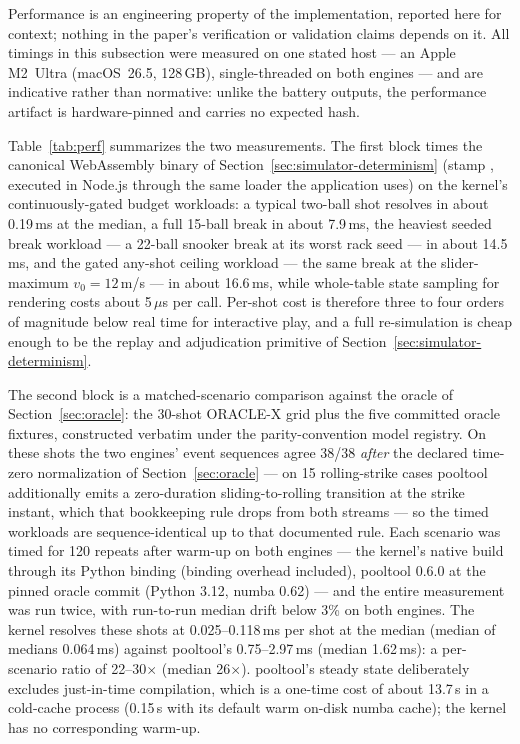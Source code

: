 Performance is an engineering property of the implementation, reported
here for context; nothing in the paper's verification or validation
claims depends on it. All timings in this subsection were measured on one
stated host --- an Apple M2~Ultra (macOS~26.5, 128\,GB), single-threaded
on both engines --- and are indicative rather than normative: unlike the
battery outputs, the performance artifact is hardware-pinned and carries
no expected hash.

Table~\ref{tab:perf} summarizes the two measurements. The first block
times the canonical WebAssembly binary of
Section~\ref{sec:simulator-determinism} (stamp ,
executed in Node.js through the same loader the application uses) on the
kernel's continuously-gated budget workloads: a typical two-ball shot
resolves in about 0.19\,ms at the median, a full 15-ball break in about
7.9\,ms, the heaviest seeded break workload --- a 22-ball snooker break
at its worst rack seed --- in about 14.5\,ms, and the gated any-shot
ceiling workload --- the same break at the slider-maximum
$v_0 = 12$\,m/s --- in about 16.6\,ms, while whole-table state
sampling for rendering costs about 5\,$\mu$s per call. Per-shot cost is
therefore three to four orders of magnitude below real time for
interactive play, and a full re-simulation is cheap enough to be the
replay and adjudication primitive of
Section~\ref{sec:simulator-determinism}.

The second block is a matched-scenario comparison against the oracle of
Section~\ref{sec:oracle}: the 30-shot ORACLE-X  grid plus the
five committed oracle fixtures, constructed verbatim under the
parity-convention model registry. On these shots the two engines'
event sequences agree 38/38 \emph{after} the declared time-zero
normalization of Section~\ref{sec:oracle} --- on 15 rolling-strike cases
pooltool additionally emits a zero-duration sliding-to-rolling
transition at the strike instant, which that bookkeeping rule drops from
both streams --- so the timed workloads are sequence-identical up to
that documented rule. Each scenario was timed for 120 repeats after
warm-up on both engines --- the kernel's native build through its Python
binding (binding overhead included), pooltool 0.6.0 at the pinned oracle
commit (Python 3.12, numba 0.62) --- and the entire measurement was run
twice, with run-to-run median drift below 3\% on both engines. The kernel
resolves these shots at 0.025--0.118\,ms per shot at the median
(median of medians 0.064\,ms) against pooltool's 0.75--2.97\,ms (median
1.62\,ms): a per-scenario ratio of 22--30$\times$ (median 26$\times$).
pooltool's steady state deliberately excludes just-in-time compilation,
which is a one-time cost of about 13.7\,s in a cold-cache process (0.15\,s
with its default warm on-disk numba cache); the kernel has no
corresponding warm-up.

